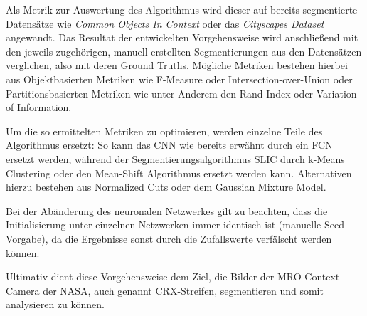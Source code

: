 \documentclass[a4paper,twocolumn,abstract,DIV=16]{scrartcl}
\begin{document}
Als Metrik zur Auswertung des Algorithmus wird dieser auf bereits segmentierte Datensätze wie \textit{Common Objects In Context}\cite{LMBHPRDZ:ECCV:2014} oder das \textit{Cityscapes Dataset}\cite{Cordts2016Cityscapes} angewandt. Das Resultat der entwickelten Vorgehensweise wird anschließend mit den jeweils zugehörigen, manuell erstellten Segmentierungen aus den Datensätzen verglichen, also mit deren Ground Truths. Mögliche Metriken bestehen hierbei aus Objektbasierten Metriken wie F-Measure oder Intersection-over-Union oder Partitionsbasierten Metriken wie unter Anderem den Rand Index\cite{randindex} oder Variation of Information\cite{meila2003comparing}.

Um die so ermittelten Metriken zu optimieren, werden einzelne Teile des Algorithmus ersetzt: So kann das CNN wie bereits erwähnt durch ein FCN ersetzt werden, während der Segmentierungsalgorithmus SLIC durch k-Means Clustering oder den Mean-Shift Algorithmus ersetzt werden kann.\cite{2019arXiv190603359A} Alternativen hierzu bestehen aus Normalized Cuts\cite{shi2000normalized} oder dem Gaussian Mixture Model\cite{8360143}.

Bei der Abänderung des neuronalen Netzwerkes gilt zu beachten, dass die Initialisierung unter einzelnen Netzwerken immer identisch ist (manuelle Seed-Vorgabe), da die Ergebnisse sonst durch die Zufallswerte verfälscht werden können.

Ultimativ dient diese Vorgehensweise dem Ziel, die Bilder der MRO Context Camera der NASA\cite{doi:10.1029/2006JE002808}, auch genannt CRX-Streifen, segmentieren und somit analysieren zu können.

\renewcommand\refname{Referenzen}

\end{document}

